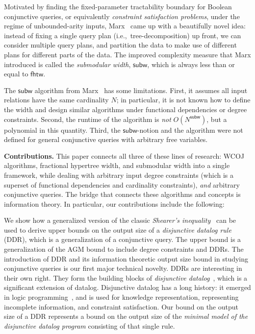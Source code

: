 \documentclass[10pt,a4paper]{article}
\newcommand{\agm}{\textsf{AGM}\xspace}
\newcommand{\fhtw}{\textsf{fhtw}}
\newcommand{\subm}{\textsf{subw}}
\begin{document}
Motivated by finding the fixed-parameter tractability boundary for Boolean conjunctive
queries, or equivalently {\em constraint satisfaction problems}, under the regime of
unbounded-arity inputs, Marx~\cite{DBLP:journals/jacm/Marx13} came up with a beautifully
novel idea: instead of fixing a single query plan (i.e.,~tree-decomposition)
up front, we can consider multiple query
plans, and partition the data to make use of different plans for different parts of the
data. The improved complexity measure that Marx introduced is called the {\em submodular
width}, $\subm$, which is always less than or equal to $\fhtw$.

The $\subm$ algorithm from Marx~\cite{DBLP:journals/jacm/Marx13} has some limitations. First,
it assumes all input relations have the same cardinality $N$; in particular, it is not known
how to define the width and design similar algorithms under functional dependencies or degree
constraints. Second, the runtime of the
algorithm is {\em not} $O(N^{\subm})$, but a polynomial in this quantity.
Third, the $\subm$-notion and the algorithm were not defined for general conjunctive queries
with arbitrary free variables.

\textbf{Contributions.}
This paper connects all three of these lines of research: WCOJ algorithms, fractional
hypertree width, and submodular width into a single framework, while dealing with arbitrary
input degree constraints (which is a superset of functional dependencies and cardinality
constraints), {\em and} arbitrary conjunctive queries. The bridge that connects these
algorithms and concepts is information theory. In particular, our contributions include the
following:

We show how a generalized version of the classic {\em Shearer's inequality}~\cite{MR1639767}
can be used to derive upper bounds on the output size of a {\em disjunctive datalog rule}
(DDR), which is a generalization of a conjunctive query.
The upper bound is a generalization of the \agm bound to include degree constraints and
DDRs. The introduction of DDR and its information theoretic output size bound in studying
conjunctive queries is our first major technical novelty.
%
DDRs are interesting in their own right. They form the building blocks of
\emph{disjunctive datalog}~\cite{DBLP:journals/tods/EiterGM97}, which is a significant
extension of datalog.  Disjunctive datalog has a long history: it emerged in logic
programming~\cite{DBLP:books/daglib/0069187,DBLP:journals/amai/Minker94}, and is used for
knowledge representation, representing incomplete information, and constraint satisfaction.
Our bound on the output size of a DDR represents a bound on the output size of the
\emph{minimal model of the disjunctive datalog program} consisting of that single rule.
\end{document}
